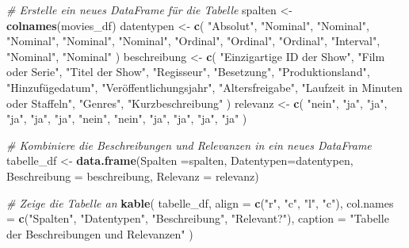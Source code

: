 \documentclass[
]{article}
\newenvironment{Shaded}{\begin{snugshade}}{\end{snugshade}}
\newcommand{\AttributeTok}[1]{\textcolor[rgb]{0.13,0.29,0.53}{#1}}
\newcommand{\CommentTok}[1]{\textcolor[rgb]{0.56,0.35,0.01}{\textit{#1}}}
\newcommand{\FunctionTok}[1]{\textcolor[rgb]{0.13,0.29,0.53}{\textbf{#1}}}
\newcommand{\NormalTok}[1]{#1}
\newcommand{\OtherTok}[1]{\textcolor[rgb]{0.56,0.35,0.01}{#1}}
\newcommand{\StringTok}[1]{\textcolor[rgb]{0.31,0.60,0.02}{#1}}
\begin{document}
\begin{Shaded}
\begin{Highlighting}[]
\CommentTok{\# Erstelle ein neues DataFrame für die Tabelle}
\NormalTok{spalten }\OtherTok{\textless{}{-}} \FunctionTok{colnames}\NormalTok{(movies\_df)}
\NormalTok{datentypen }\OtherTok{\textless{}{-}} \FunctionTok{c}\NormalTok{(}
  \StringTok{"Absolut"}\NormalTok{,}
  \StringTok{"Nominal"}\NormalTok{,}
  \StringTok{"Nominal"}\NormalTok{,}
  \StringTok{"Nominal"}\NormalTok{,}
  \StringTok{"Nominal"}\NormalTok{,}
  \StringTok{"Nominal"}\NormalTok{,}
  \StringTok{"Ordinal"}\NormalTok{,}
  \StringTok{"Ordinal"}\NormalTok{,}
  \StringTok{"Ordinal"}\NormalTok{,}
  \StringTok{"Interval"}\NormalTok{,}
  \StringTok{"Nominal"}\NormalTok{,}
  \StringTok{"Nominal"}
\NormalTok{)}
\NormalTok{beschreibung }\OtherTok{\textless{}{-}} \FunctionTok{c}\NormalTok{(}
    \StringTok{"Einzigartige ID der Show"}\NormalTok{, }
    \StringTok{"Film oder Serie"}\NormalTok{, }
    \StringTok{"Titel der Show"}\NormalTok{, }
    \StringTok{"Regisseur"}\NormalTok{, }
    \StringTok{"Besetzung"}\NormalTok{,}
    \StringTok{"Produktionsland"}\NormalTok{,}
    \StringTok{"Hinzufügedatum"}\NormalTok{,}
    \StringTok{"Veröffentlichungsjahr"}\NormalTok{,}
    \StringTok{"Altersfreigabe"}\NormalTok{,}
    \StringTok{"Laufzeit in Minuten oder Staffeln"}\NormalTok{,}
    \StringTok{"Genres"}\NormalTok{,}
    \StringTok{"Kurzbeschreibung"}
\NormalTok{)}
\NormalTok{relevanz }\OtherTok{\textless{}{-}} \FunctionTok{c}\NormalTok{(}
    \StringTok{"nein"}\NormalTok{,}
    \StringTok{"ja"}\NormalTok{,}
    \StringTok{"ja"}\NormalTok{,}
    \StringTok{"ja"}\NormalTok{,}
    \StringTok{"ja"}\NormalTok{,}
    \StringTok{"ja"}\NormalTok{,}
    \StringTok{"nein"}\NormalTok{,}
    \StringTok{"nein"}\NormalTok{,}
    \StringTok{"ja"}\NormalTok{,}
    \StringTok{"ja"}\NormalTok{,}
    \StringTok{"ja"}\NormalTok{,}
    \StringTok{"ja"}
\NormalTok{)}

\CommentTok{\# Kombiniere die Beschreibungen und Relevanzen in ein neues DataFrame}
\NormalTok{tabelle\_df }\OtherTok{\textless{}{-}} \FunctionTok{data.frame}\NormalTok{(}\AttributeTok{Spalten =}\NormalTok{spalten, }\AttributeTok{Datentypen=}\NormalTok{datentypen,  }\AttributeTok{Beschreibung =}\NormalTok{ beschreibung, }\AttributeTok{Relevanz =}\NormalTok{ relevanz)}

\CommentTok{\# Zeige die Tabelle an}
\FunctionTok{kable}\NormalTok{(}
\NormalTok{  tabelle\_df,}
  \AttributeTok{align =} \FunctionTok{c}\NormalTok{(}\StringTok{"r"}\NormalTok{, }\StringTok{"c"}\NormalTok{, }\StringTok{"l"}\NormalTok{, }\StringTok{"c"}\NormalTok{),}
  \AttributeTok{col.names =} \FunctionTok{c}\NormalTok{(}\StringTok{"Spalten"}\NormalTok{, }\StringTok{"Datentypen"}\NormalTok{, }\StringTok{"Beschreibung"}\NormalTok{, }\StringTok{"Relevant?"}\NormalTok{),}
  \AttributeTok{caption =} \StringTok{"Tabelle der Beschreibungen und Relevanzen"}
\NormalTok{)}
\end{Highlighting}
\end{Shaded}
\end{document}
